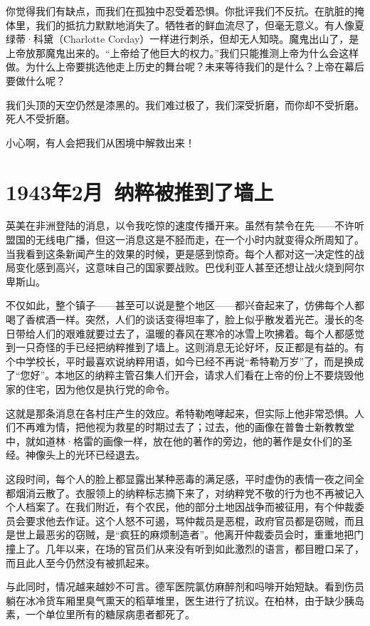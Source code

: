 \documentclass[UTF8]{ctexart}
\begin{document}
你觉得我们有缺点，而我们在孤独中忍受着恐惧。你批评我们不反抗。在肮脏的掩体里，我们的抵抗力默默地消失了。牺牲者的鲜血流尽了，但毫无意义。有人像夏绿蒂·科黛（Charlotte Corday）一样进行刺杀，但却无人知晓。魔鬼出山了，是上帝放那魔鬼出来的。“上帝给了他巨大的权力。”我们只能推测上帝为什么会这样做。为什么上帝要挑选他走上历史的舞台呢？未来等待我们的是什么？上帝在幕后要做什么呢？

我们头顶的天空仍然是漆黑的。我们难过极了，我们深受折磨，而你却不受折磨。死人不受折磨。

小心啊，有人会把我们从困境中解救出来！

\section{1943年2月\ 纳粹被推到了墙上}

英美在非洲登陆的消息，以令我吃惊的速度传播开来。虽然有禁令在先——不许听盟国的无线电广播，但这一消息这是不胫而走，在一个小时内就变得众所周知了。当我看到这条新闻产生的效果的时候，更是感到惊奇。每个人都对这一决定性的战局变化感到高兴，这意味自己的国家要战败。巴伐利亚人甚至还想让战火烧到阿尔卑斯山。

不仅如此，整个镇子——甚至可以说是整个地区——都兴奋起来了，仿佛每个人都喝了香槟酒一样。突然，人们的谈话变得坦率了，脸上似乎散发着光芒。漫长的冬日带给人们的艰难就要过去了，温暖的春风在寒冷的冰雪上吹拂着。每个人都感觉到一只奇怪的手已经把纳粹推到了墙上。这则消息无论好坏，反正都是有益的。有个中学校长，平时最喜欢说纳粹用语，如今已经不再说“希特勒万岁”了，而是换成了“您好”。本地区的纳粹主管召集人们开会，请求人们看在上帝的份上不要烧毁他家的住宅，因为他仅是执行党的命令。

这就是那条消息在各村庄产生的效应。希特勒咆哮起来，但实际上他非常恐惧。人们不再难为情，把他视为救星的时期过去了；过去，他的画像在普鲁士新教教堂中，就如道林·格雷的画像一样，放在他的著作的旁边，他的著作是女仆们的圣经。神像头上的光环已经退去。

这段时间，每个人的脸上都显露出某种恶毒的满足感，平时虚伪的表情一夜之间全都烟消云散了。衣服领上的纳粹标志摘下来了，对纳粹党不敬的行为也不再被记入个人档案了。在我们附近，有个农民，他的部分土地因战争而被征用，有个仲裁委员会要求他去作证。这个人怒不可遏，骂仲裁员是恶棍，政府官员都是窃贼，而且是世上最恶劣的窃贼，是“疯狂的麻烦制造者”。他离开仲裁委员会时，重重地把门撞上了。几年以来，在场的官员们从来没有听到如此激烈的语言，都目瞪口呆了，而且此人至今仍然没有被抓起来。

与此同时，情况越来越妙不可言。德军医院氯仿麻醉剂和吗啡开始短缺。看到伤员躺在冰冷货车厢里臭气熏天的稻草堆里，医生进行了抗议。在柏林，由于缺少胰岛素，一个单位里所有的糖尿病患者都死了。
\end{document}
